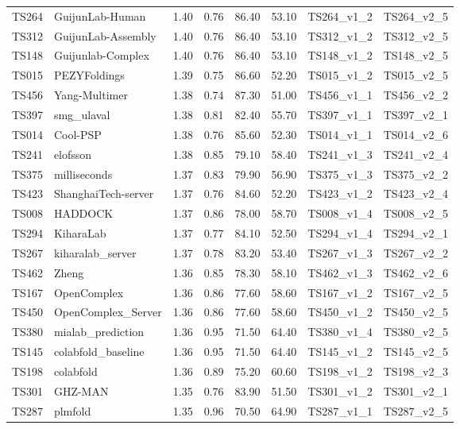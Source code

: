 \begin{longtable}{llllllll}
TS264 & GuijunLab-Human & 1.40 & 0.76 & 86.40 & 53.10 & TS264\_v1\_2 & TS264\_v2\_5 \\ 
TS312 & GuijunLab-Assembly & 1.40 & 0.76 & 86.40 & 53.10 & TS312\_v1\_2 & TS312\_v2\_5 \\ 
TS148 & Guijunlab-Complex & 1.40 & 0.76 & 86.40 & 53.10 & TS148\_v1\_2 & TS148\_v2\_5 \\ 
TS015 & PEZYFoldings & 1.39 & 0.75 & 86.60 & 52.20 & TS015\_v1\_2 & TS015\_v2\_5 \\ 
TS456 & Yang-Multimer & 1.38 & 0.74 & 87.30 & 51.00 & TS456\_v1\_1 & TS456\_v2\_2 \\ 
TS397 & smg\_ulaval & 1.38 & 0.81 & 82.40 & 55.70 & TS397\_v1\_1 & TS397\_v2\_1 \\ 
TS014 & Cool-PSP & 1.38 & 0.76 & 85.60 & 52.30 & TS014\_v1\_1 & TS014\_v2\_6 \\ 
TS241 & elofsson & 1.38 & 0.85 & 79.10 & 58.40 & TS241\_v1\_3 & TS241\_v2\_4 \\ 
TS375 & milliseconds & 1.37 & 0.83 & 79.90 & 56.90 & TS375\_v1\_3 & TS375\_v2\_2 \\ 
TS423 & ShanghaiTech-server & 1.37 & 0.76 & 84.60 & 52.20 & TS423\_v1\_2 & TS423\_v2\_4 \\ 
TS008 & HADDOCK & 1.37 & 0.86 & 78.00 & 58.70 & TS008\_v1\_4 & TS008\_v2\_5 \\ 
TS294 & KiharaLab & 1.37 & 0.77 & 84.10 & 52.50 & TS294\_v1\_4 & TS294\_v2\_1 \\ 
TS267 & kiharalab\_server & 1.37 & 0.78 & 83.20 & 53.40 & TS267\_v1\_3 & TS267\_v2\_2 \\ 
TS462 & Zheng & 1.36 & 0.85 & 78.30 & 58.10 & TS462\_v1\_3 & TS462\_v2\_6 \\ 
TS167 & OpenComplex & 1.36 & 0.86 & 77.60 & 58.60 & TS167\_v1\_2 & TS167\_v2\_5 \\ 
TS450 & OpenComplex\_Server & 1.36 & 0.86 & 77.60 & 58.60 & TS450\_v1\_2 & TS450\_v2\_5 \\ 
TS380 & mialab\_prediction & 1.36 & 0.95 & 71.50 & 64.40 & TS380\_v1\_4 & TS380\_v2\_5 \\ 
TS145 & colabfold\_baseline & 1.36 & 0.95 & 71.50 & 64.40 & TS145\_v1\_2 & TS145\_v2\_5 \\ 
TS198 & colabfold & 1.36 & 0.89 & 75.20 & 60.60 & TS198\_v1\_2 & TS198\_v2\_3 \\ 
TS301 & GHZ-MAN & 1.35 & 0.76 & 83.90 & 51.50 & TS301\_v1\_2 & TS301\_v2\_1 \\ 
TS287 & plmfold & 1.35 & 0.96 & 70.50 & 64.90 & TS287\_v1\_1 & TS287\_v2\_5 \\ 

\end{longtable}
